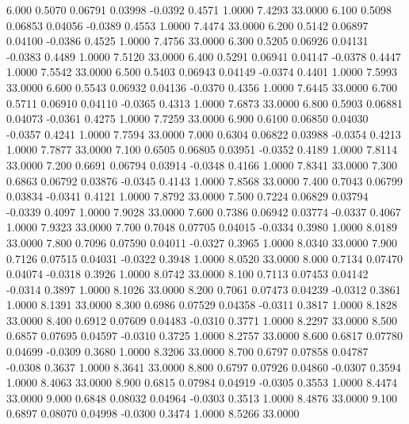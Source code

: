    6.000   0.5070   0.06791   0.03998  -0.0392   0.4571   1.0000   7.4293  33.0000
   6.100   0.5098   0.06853   0.04056  -0.0389   0.4553   1.0000   7.4474  33.0000
   6.200   0.5142   0.06897   0.04100  -0.0386   0.4525   1.0000   7.4756  33.0000
   6.300   0.5205   0.06926   0.04131  -0.0383   0.4489   1.0000   7.5120  33.0000
   6.400   0.5291   0.06941   0.04147  -0.0378   0.4447   1.0000   7.5542  33.0000
   6.500   0.5403   0.06943   0.04149  -0.0374   0.4401   1.0000   7.5993  33.0000
   6.600   0.5543   0.06932   0.04136  -0.0370   0.4356   1.0000   7.6445  33.0000
   6.700   0.5711   0.06910   0.04110  -0.0365   0.4313   1.0000   7.6873  33.0000
   6.800   0.5903   0.06881   0.04073  -0.0361   0.4275   1.0000   7.7259  33.0000
   6.900   0.6100   0.06850   0.04030  -0.0357   0.4241   1.0000   7.7594  33.0000
   7.000   0.6304   0.06822   0.03988  -0.0354   0.4213   1.0000   7.7877  33.0000
   7.100   0.6505   0.06805   0.03951  -0.0352   0.4189   1.0000   7.8114  33.0000
   7.200   0.6691   0.06794   0.03914  -0.0348   0.4166   1.0000   7.8341  33.0000
   7.300   0.6863   0.06792   0.03876  -0.0345   0.4143   1.0000   7.8568  33.0000
   7.400   0.7043   0.06799   0.03834  -0.0341   0.4121   1.0000   7.8792  33.0000
   7.500   0.7224   0.06829   0.03794  -0.0339   0.4097   1.0000   7.9028  33.0000
   7.600   0.7386   0.06942   0.03774  -0.0337   0.4067   1.0000   7.9323  33.0000
   7.700   0.7048   0.07705   0.04015  -0.0334   0.3980   1.0000   8.0189  33.0000
   7.800   0.7096   0.07590   0.04011  -0.0327   0.3965   1.0000   8.0340  33.0000
   7.900   0.7126   0.07515   0.04031  -0.0322   0.3948   1.0000   8.0520  33.0000
   8.000   0.7134   0.07470   0.04074  -0.0318   0.3926   1.0000   8.0742  33.0000
   8.100   0.7113   0.07453   0.04142  -0.0314   0.3897   1.0000   8.1026  33.0000
   8.200   0.7061   0.07473   0.04239  -0.0312   0.3861   1.0000   8.1391  33.0000
   8.300   0.6986   0.07529   0.04358  -0.0311   0.3817   1.0000   8.1828  33.0000
   8.400   0.6912   0.07609   0.04483  -0.0310   0.3771   1.0000   8.2297  33.0000
   8.500   0.6857   0.07695   0.04597  -0.0310   0.3725   1.0000   8.2757  33.0000
   8.600   0.6817   0.07780   0.04699  -0.0309   0.3680   1.0000   8.3206  33.0000
   8.700   0.6797   0.07858   0.04787  -0.0308   0.3637   1.0000   8.3641  33.0000
   8.800   0.6797   0.07926   0.04860  -0.0307   0.3594   1.0000   8.4063  33.0000
   8.900   0.6815   0.07984   0.04919  -0.0305   0.3553   1.0000   8.4474  33.0000
   9.000   0.6848   0.08032   0.04964  -0.0303   0.3513   1.0000   8.4876  33.0000
   9.100   0.6897   0.08070   0.04998  -0.0300   0.3474   1.0000   8.5266  33.0000
